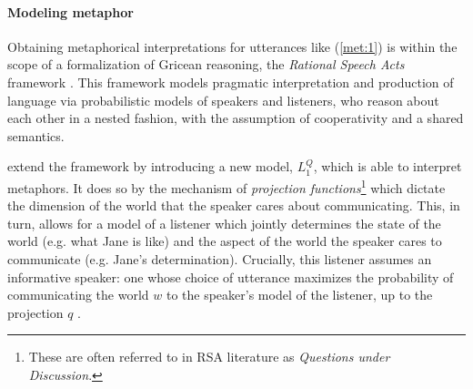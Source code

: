 \documentclass[OpenMind]{stjour}
\newcommand{\Listener}{L}
\newcommand{\QLONE}{\Listener_{{1}}^{{Q}}}
\begin{document}
	\paragraph{Modeling metaphor}
	Obtaining metaphorical interpretations for utterances like (\ref{met:1}) is within the scope of a formalization of Gricean reasoning, the \emph{Rational Speech Acts} framework \citep{frank2012predicting}. This framework models pragmatic interpretation and production of language via probabilistic models of speakers and listeners, who reason about each other in a nested fashion, with the assumption of cooperativity and a shared semantics.






	\citet{kao} extend the framework by introducing a new model, $\QLONE$, which is able to interpret metaphors. It does so by the mechanism of \emph{projection functions}\footnote{These are often referred to in RSA literature as \emph{Questions under Discussion}.} which dictate the dimension of the world that the speaker cares about communicating. This, in turn, allows for a model of a listener which jointly determines the state of the world (e.g. what Jane is like) and the aspect of the world the speaker cares to communicate (e.g. Jane's determination). Crucially, this listener assumes an informative speaker: one whose choice of utterance maximizes the probability of communicating the world $w$ to the speaker's model of the listener, up to the projection $q$ .
	
\end{document}
